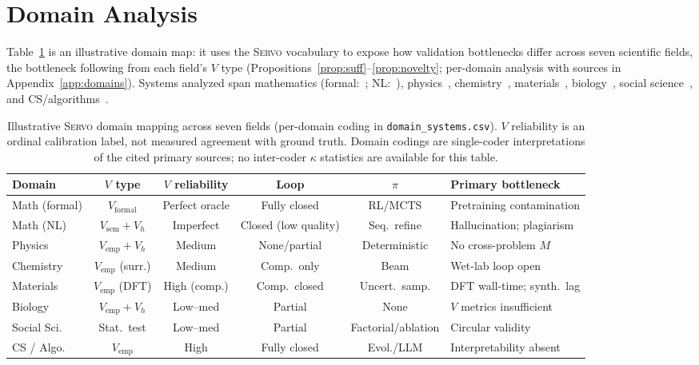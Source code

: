 \documentclass{article}
\newcommand{\framework}{\textsc{Servo}}
\begin{document}
\section{Domain Analysis}
\label{sec:domains}

Table~\ref{tab:domain-comparison} is an illustrative domain map: it uses the \framework{} vocabulary to expose how validation bottlenecks differ across seven scientific fields, the bottleneck following from each field's $V$ type (Propositions~\ref{prop:suff}--\ref{prop:novelty}; per-domain analysis with sources in Appendix~\ref{app:domains}). Systems analyzed span mathematics (formal:~\citep{romera2023funsearch,xin2024deepseek}; NL:~\citep{google2026aletheia}), physics~\citep{udrescu2020afeynman,cranmer2020symbolic}, chemistry~\citep{bran2023chemcrow,sprueill2024chemreasoner,kamber2026chemist}, materials~\citep{merchant2023gnome}, biology~\citep{odonoghue2023bioplanner}, social science~\citep{manning2024automated,aher2023turing,park2023generative}, and CS/algorithms~\citep{real2020automlzero,surina2025algodiscovery,jaber2026autokernel}.

\begin{table}[h]
\centering
\small
\setlength{\tabcolsep}{4pt}
\begin{tabular}{@{}lccccp{2.6cm}@{}}
\toprule
Domain & $V$ type & $V$ reliability & Loop & $\pi$ & Primary bottleneck \\
\midrule
Math (formal) & $V_\text{formal}$ & Perfect oracle & Fully closed & RL/MCTS  & Pretraining contamination \\
Math (NL) & $V_\text{sem}+V_h$ & Imperfect & Closed (low quality) & Seq.\ refine & Hallucination; plagiarism \\
Physics & $V_\text{emp}+V_h$ & Medium & None/partial & Deterministic & No cross-problem $M$ \\
Chemistry & $V_\text{emp}$ (surr.) & Medium & Comp.\ only & Beam & Wet-lab loop open \\
Materials & $V_\text{emp}$ (DFT) & High (comp.) & Comp.\ closed & Uncert.\ samp. & DFT wall-time; synth.\ lag \\
Biology & $V_\text{emp}+V_h$ & Low--med & Partial & None & $V$ metrics insufficient \\
Social Sci. & Stat.\ test & Low--med & Partial & Factorial/ablation & Circular validity \\[3pt]
CS / Algo. & $V_\text{emp}$ & High & Fully closed & Evol./LLM & Interpretability absent \\
\bottomrule
\end{tabular}
\caption{Illustrative \framework{} domain mapping across seven fields (per-domain coding in \texttt{domain\_systems.csv}). $V$ reliability is an ordinal calibration label, not measured agreement with ground truth. Domain codings are single-coder interpretations of the cited primary sources; no inter-coder $\kappa$ statistics are available for this table.}
\label{tab:domain-comparison}
\end{table}
\end{document}
